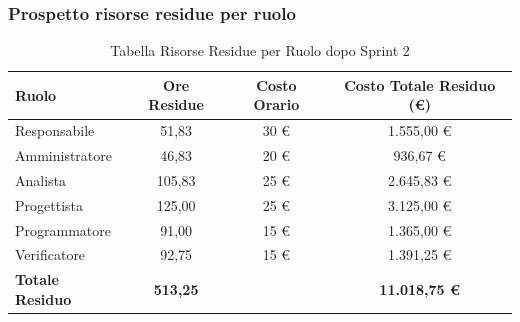 \subsubsection{Prospetto risorse residue per ruolo}
\begin{table}[H]
    \centering
    \renewcommand{\arraystretch}{1.3}
    \begin{tabularx}{\textwidth}{|X|c|c|c|}
        \hline
        \textbf{Ruolo} & \textbf{Ore Residue} & \textbf{Costo Orario} & \textbf{Costo Totale Residuo (\euro)} \\
        \hline
        Responsabile & 51,83 & 30 \euro & 1.555,00 \euro \\
        Amministratore & 46,83 & 20 \euro & 936,67 \euro \\
        Analista & 105,83 & 25 \euro & 2.645,83 \euro \\
        Progettista & 125,00 & 25 \euro & 3.125,00 \euro \\
        Programmatore & 91,00 & 15 \euro & 1.365,00 \euro \\
        Verificatore & 92,75 & 15 \euro & 1.391,25 \euro \\
        \hline
        \textbf{Totale Residuo} & \textbf{513,25} & & \textbf{11.018,75 \euro} \\
        \hline
    \end{tabularx}
    \caption{Tabella Risorse Residue per Ruolo dopo Sprint 2}
\end{table}

